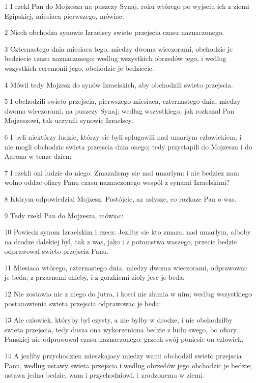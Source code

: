 \par 1 I rzekl Pan do Mojzesza na puszczy Synaj, roku wtórego po wyjsciu ich z ziemi Egipskiej, miesiaca pierwszego, mówiac:
\par 2 Niech obchodza synowie Izraelscy swieto przejscia czasu naznaczonego.
\par 3 Czternastego dnia miesiaca tego, miedzy dwoma wieczorami, obchodzic je bedziecie czasu naznaczonego; wedlug wszystkich obrzedów jego, i wedlug wszystkich ceremonii jego, obchodzic je bedziecie.
\par 4 Mówil tedy Mojzesz do synów Izraelskich, aby obchodzili swieto przejscia.
\par 5 I obchodzili swieto przejscia, pierwszego miesiaca, czternastego dnia, miedzy dwoma wieczorami, na puszczy Synaj; wedlug wszystkiego, jak rozkazal Pan Mojzeszowi, tak uczynili synowie Izraelscy.
\par 6 I byli niektórzy ludzie, którzy sie byli splugawili nad umarlym czlowiekiem, i nie mogli obchodzic swieta przejscia dnia onego; tedy przystapili do Mojzesza i do Aarona w tenze dzien;
\par 7 I rzekli oni ludzie do niego: Zmazalismy sie nad umarlym: i nie bedziez nam wolno oddac ofiary Panu czasu naznaczonego wespól z synami Izraelskimi?
\par 8 Którym odpowiedzial Mojzesz: Postójcie, az uslysze, co rozkaze Pan o was.
\par 9 Tedy rzekl Pan do Mojzesza, mówiac:
\par 10 Powiedz synom Izraelskim i rzecz: Jezliby sie kto zmazal nad umarlym, alboby na drodze dalekiej byl, tak z was, jako i z potomstwa waszego, przecie bedzie odprawowal swieto przejscia Panu.
\par 11 Miesiaca wtórego, czternastego dnia, miedzy dwoma wieczorami, odprawowac je beda; z przasnemi chleby, i z gorzkiemi zioly jesc je beda:
\par 12 Nie zostawia nic z niego do jutra, i kosci nie zlamia w nim; wedlug wszystkiego postanowienia swieta przejscia odprawowac je beda:
\par 13 Ale czlowiek, któryby byl czysty, a nie bylby w drodze, i nie obchodzilby swieta przejscia, tedy dusza ona wykorzeniona bedzie z ludu swego, bo ofiary Panskiej nie odprawowal czasu naznaczonego; grzech swój poniesie on czlowiek.
\par 14 A jezliby przychodzien mieszkajacy miedzy wami obchodzil swieto przejscia Panu, wedlug ustawy swieta przejscia i wedlug obrzedów jego obchodzic je bedzie; ustawa jedna bedzie, wam i przychodniowi, i zrodzonemu w ziemi.
